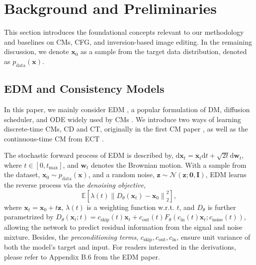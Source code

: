 \vspace{-0.3cm}
\section{Background and Preliminaries}
\vspace{-0.15cm}
This section introduces the foundational concepts relevant to our methodology and baselines on CMs, CFG, and inversion-based image editing. In the remaining discussion, we denote \(\boldsymbol{x}_0\) as a sample from the target data distribution, denoted as \(p_\text{data}(\boldsymbol{x})\). 

\vspace{-0.15cm}
\subsection{EDM and Consistency Models}
\label{sec:edm_cm}
\vspace{-0.15cm}

In this paper, we mainly consider EDM \cite{karras2022elucidating}, a popular formulation of DM, diffusion scheduler, and ODE widely used by CMs \cite{song2023consistency,song2023improved,li2024bidirectional,ect}. We introduce two ways of learning discrete-time CMs, CD and CT, originally in the first CM paper \cite{song2023consistency}, as well as the continuous-time CM from ECT \cite{ect}.  

 The stochastic forward process of EDM is described by, \(\text{d}\boldsymbol{x}_t = \boldsymbol{x}_t\text{d}t + \sqrt{2t}\text{d}\boldsymbol{w}_t\), where \(t \in [0, t_\text{max}]\), and \(\boldsymbol{w}_t\) denotes the Brownian motion. With a sample from the dataset, \(\boldsymbol{x}_0 \sim p_\text{data}(\boldsymbol{x})\), and a random noise, \( \boldsymbol{z} \sim \mathcal{N}(\boldsymbol{z};\boldsymbol{0},\mathbf{I})\), EDM learns the reverse process via the \textit{denoising objective}, 
\begin{equation}
    \mathbb{E} \left[ \lambda(t) \left\| D_{\theta}(\boldsymbol{x}_t) - \boldsymbol{x}_0 \right\|_2^2 \right],
    \label{eq:edm-obj}
\end{equation}
where \(\boldsymbol{x}_t = \boldsymbol{x}_0+t\boldsymbol{z}\), \(\lambda(t)\) is a weighting function w.r.t. \(t\), and \(D_{\theta}\) is further parametrized by \(D_{\theta}(\boldsymbol{x}_t; t) = c_{\text{skip}}(t) \boldsymbol{x}_t + c_{\text{out}}(t) F_{\theta}(c_{\text{in}}(t) \boldsymbol{x}_t; c_{\text{noise}}(t))\), allowing the network to predict residual information from the signal and noise mixture. Besides, the \textit{preconditioning terms}, \(c_{\text{skip}}, c_{\text{out}}, c_{\text{in}}\), ensure unit variance of both the model's target and input. For readers interested in the derivations, please refer to Appendix B.6 from the EDM paper.

